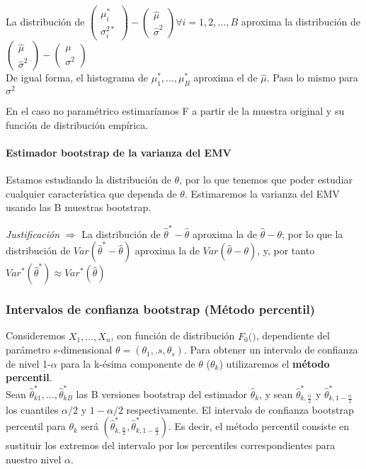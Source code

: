 \noindent La distribución de $\begin{pmatrix}\mu^*_i \\ \sigma^{2*}_i\end{pmatrix}-\begin{pmatrix}\hat\mu \\ \hat\sigma^{2}\end{pmatrix}\forall i=1,2,\dots,B$ aproxima la distribución de $\begin{pmatrix}\hat\mu \\ \hat\sigma^{2}\end{pmatrix}-\begin{pmatrix}\mu \\ \sigma^{2}\end{pmatrix}$\\
De igual forma, el histograma de $\mu^*_1,\dots,\mu^*_B$ aproxima el de $\hat\mu$. Pasa lo mismo para $\sigma^2$

En el caso no paramétrico estimaríamos F a partir de la muestra original y su función de distribución empírica.

\paragraph{Estimador bootstrap de la varianza del EMV}

Estamos estudiando la distribución de $\theta$, por lo que tenemos que poder estudiar cualquier característica que dependa de $\theta$. Estimaremos la varianza del EMV usando las B muestras bootstrap.

\textit{Justificación} $\Longrightarrow$ La distribución de $\hat\theta^*-\hat\theta$ aproxima la de $\hat\theta-\theta$; por lo que la distribución de $Var(\hat\theta^*-\hat\theta)$ aproxima la de $Var(\hat\theta-\theta)$, y, por tanto 
$Var^*(\hat\theta^*)\approx Var^*(\hat\theta)$

\subsubsection{Intervalos de confianza bootstrap (Método percentil)}
Consideremos $X_1,\dots,X_n$, con función de distribución $F_0(\dot)$, dependiente del parámetro s-dimensional $\theta=(\theta_1,.s,\theta_s)$. Para obtener un intervalo de confianza de nivel 1-$\alpha$ para la k-ésima componente de $\theta$ ($\theta_k$) utilizaremos el \textbf{método percentil}.\\

Sean $\hat\theta_{k1}^*,\dots,\hat\theta_{kB}^*$ las B versiones bootstrap del estimador $\hat\theta_k$, y sean $\hat\theta^*_{k,\frac{\alpha}{2}}$ y $\hat\theta^*_{k,1-\frac{\alpha}{2}}$ los cuantiles $\alpha/2$ y $1-\alpha/2$ respectivamente.
El intervalo de confianza bootstrap percentil para $\theta_k$ será $\left(\hat\theta^*_{k,\frac{\alpha}{2}},\hat\theta^*_{k,1-\frac{\alpha}{2}} \right)$. Es decir, el método percentil consiste en sustituir los extremos del intervalo por los percentiles correspondientes para nuestro nivel $\alpha$.

